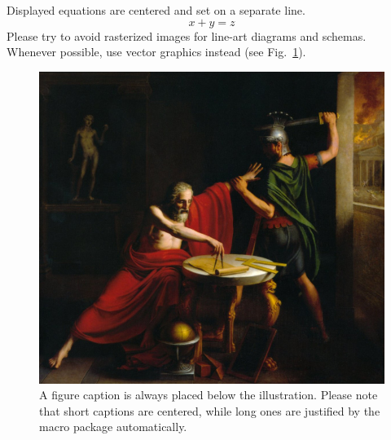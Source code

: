 \documentclass[runningheads]{llncs}
\begin{document}
\noindent Displayed equations are centered and set on a separate
line.
\begin{equation}
x + y = z
\end{equation}
Please try to avoid rasterized images for line-art diagrams and
schemas. Whenever possible, use vector graphics instead (see
Fig.~\ref{fig1}).

\begin{figure}
\includegraphics[width=\textwidth]{fig1.jpg}
\caption{A figure caption is always placed below the illustration.
Please note that short captions are centered, while long ones are
justified by the macro package automatically.} \label{fig1}
\end{figure}
\end{document}
